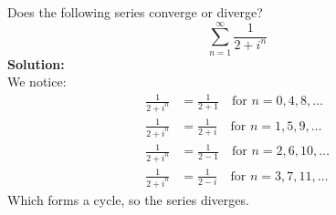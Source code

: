 \begin{example}
    Does the following series converge or diverge?
    $$\sum_{n=1}^\infty\frac1{2+i^n}$$
    \textbf{Solution:} \\
    We notice:
    \begin{align*}
        \frac{1}{2+i^n} & = \frac{1}{2+1} \quad \text{for $n=0, 4, 8, \ldots$} \\
        \frac{1}{2+i^n} & = \frac{1}{2+i} \quad \text{for $n=1,5,9,\ldots$}    \\
        \frac{1}{2+i^n} & = \frac{1}{2-1} \quad \text{for $n=2,6,10,\ldots$}   \\
        \frac{1}{2+i^n} & = \frac{1}{2-i} \quad \text{for $n=3,7,11,\ldots$}
    \end{align*}
    Which forms a cycle, so the series diverges.
\end{example}

